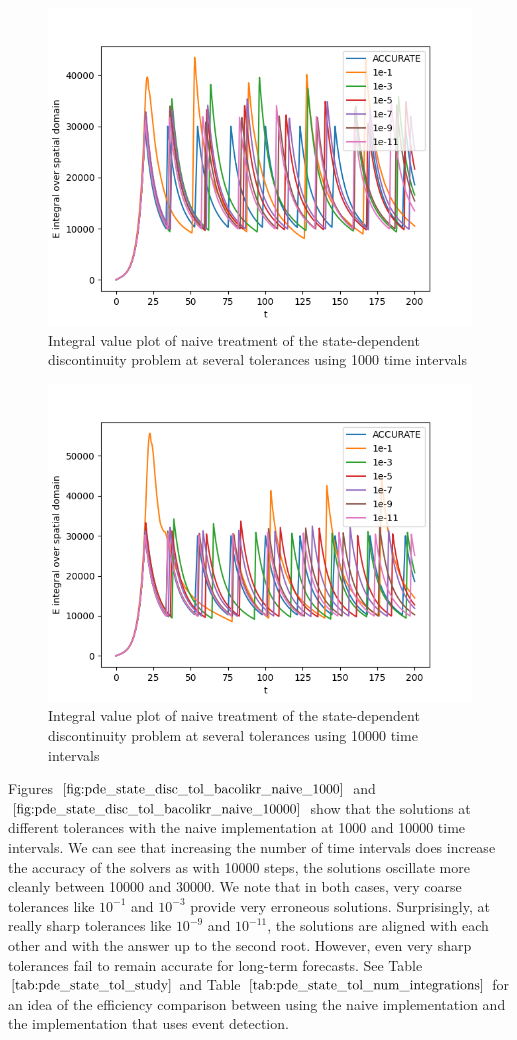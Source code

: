 \documentclass{article}
\begin{document}
\begin{figure}[H]
\centering
\includegraphics[width=0.7\linewidth]{./figures/pde_state_disc_tol_bacolikr_naive_1000}
\caption{Integral value plot of naive treatment of the state-dependent discontinuity problem at several tolerances using 1000 time intervals}
\label{fig:pde_state_disc_tol_bacolikr_naive_1000}
\end{figure}

\begin{figure}[H]
\centering
\includegraphics[width=0.7\linewidth]{./figures/pde_state_disc_tol_bacolikr_naive_10000}
\caption{Integral value plot of naive treatment of the state-dependent discontinuity problem at several tolerances using 10000 time intervals}
\label{fig:pde_state_disc_tol_bacolikr_naive_10000}
\end{figure}

Figures $\ref{fig:pde_state_disc_tol_bacolikr_naive_1000}$ and $\ref{fig:pde_state_disc_tol_bacolikr_naive_10000}$ show that the solutions at different tolerances with the naive implementation at 1000 and 10000 time intervals. We can see that increasing the number of time intervals does increase the accuracy of the solvers as with 10000 steps, the solutions oscillate more cleanly between 10000 and 30000. We note that in both cases, very coarse tolerances like $10^{-1}$ and $10^{-3}$ provide very erroneous solutions. Surprisingly, at really sharp tolerances like $10^{-9}$ and $10^{-11}$, the solutions are aligned with each other and with the answer up to the second root. However, even very sharp tolerances fail to remain accurate for long-term forecasts. See Table $\ref{tab:pde_state_tol_study}$ and Table $\ref{tab:pde_state_tol_num_integrations}$ for an idea of the efficiency comparison between using the naive implementation and the implementation that uses event detection. 
\end{document}
